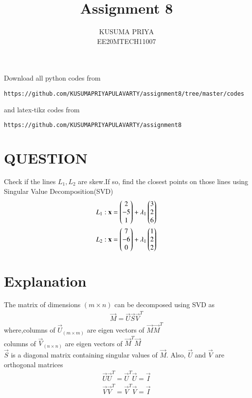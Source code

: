 \documentclass[journal,12pt,twocolumn]{IEEEtran}
\begin{document}
\renewcommand{\thefigure}{\theproblem}

\def\putbox#1#2#3{\makebox[0in][l]{\makebox[#1][l]{}\raisebox{\baselineskip}[0in][0in]{\raisebox{#2}[0in][0in]{#3}}}}
     \def\rightbox#1{\makebox[0in][r]{#1}}
     \def\centbox#1{\makebox[0in]{#1}}
     \def\topbox#1{\raisebox{-\baselineskip}[0in][0in]{#1}}
     \def\midbox#1{\raisebox{-0.5\baselineskip}[0in][0in]{#1}}
\vspace{3cm}
\title{Assignment 8}
\author{KUSUMA PRIYA\\EE20MTECH11007}

\maketitle
\newpage

\bigskip
\renewcommand{\thefigure}{\theenumi}
\renewcommand{\thetable}{\theenumi}
Download all python codes from 
\begin{lstlisting}
https://github.com/KUSUMAPRIYAPULAVARTY/assignment8/tree/master/codes
\end{lstlisting}
%
and latex-tikz codes from 
%
\begin{lstlisting}
https://github.com/KUSUMAPRIYAPULAVARTY/assignment8
\end{lstlisting}
%
 
 \section{QUESTION}
Check if the lines $L_1,L_2$ are skew.If so, find the closest points on those lines using Singular Value Decomposition(SVD)
\begin{align}
L_1: \mathbf{x}=\begin{pmatrix}2\\-5\\1\end{pmatrix}+\lambda_1\begin{pmatrix}3\\2\\6\end{pmatrix}\\
L_2: \mathbf{x}=\begin{pmatrix}7\\-6\\0\end{pmatrix}+\lambda_1\begin{pmatrix}1\\2\\2\end{pmatrix}
\end{align}

%
\section {Explanation}
The matrix  of dimensions $(m \times n)$ can be decomposed using SVD as 
\begin{align}
\vec{M}=\vec{U}\vec{S}\vec{V}^T\label{1}
\end{align}
where,columns of $\vec{U}_{(m \times m)}$ are eigen vectors of $\vec{M}\vec{M}^T$\\
columns of $\vec{V}_{(n \times n)}$ are eigen vectors of $\vec{M}^T\vec{M}$\\
$\vec{S}$ is a diagonal matrix containing singular values of $\vec{M}$. Also, $\vec{U}$ and $\vec{V}$ are orthogonal matrices
\begin{align}
    \vec{U}\vec{U}^T=\vec{U}^T\vec{U}=\vec{I}\\
     \vec{V}\vec{V}^T=\vec{V}^T\vec{V}=\vec{I}
\end{align}
\end{document}
